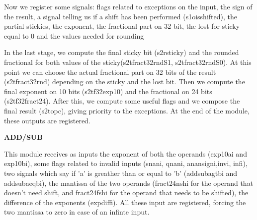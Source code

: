Now we register some signals: flags related to exceptions on the input, the sign of the result, a signal telling us if a shift has been performed (s1o\textunderscore is\textunderscore shifted), the partial stickies, the exponent, the fractional part on 32 bit, the lost for sticky equal to 0 and the values needed for rounding

In the last stage, we compute the final sticky bit (s2r\textunderscore sticky) and the rounded fractional for both values of the sticky(s2t\textunderscore fract32\textunderscore rndS1, s2t\textunderscore fract32\textunderscore rndS0). At this point we can choose the actual fractional part on 32 bits of the result (s2t\textunderscore fract32\textunderscore rnd) depending on the sticky and the lost bit.
Then we compute the final exponent on 10 bits (s2t\textunderscore f32\textunderscore exp10) and the fractional on 24 bits (s2t\textunderscore f32\textunderscore fract24).
After this, we compute some useful flags and we compose the final result (s2t\textunderscore opc), giving priority to the exceptions. At the end of the module, these outputs are registered.
\newline

\textbf{ADD/SUB}
\newline

This module receives as inputs the exponent of both the operands (exp10a\textunderscore i and exp10b\textunderscore i), some flags related to invalid inputs (snan\textunderscore i, qnan\textunderscore i, anan\textunderscore sign\textunderscore i,inv\textunderscore i, inf\textunderscore i), two signals which say if 'a' is greather than or equal to 'b' (addsub\textunderscore agtb\textunderscore i and addsub\textunderscore aeqb\textunderscore i), the mantissa of the two operands (fract24nsh\textunderscore i for the operand that doesn't need shift, and fract24fsh\textunderscore i for the operand that needs to be shifted), the difference of the exponents (exp\textunderscore diff\textunderscore i). All these input are registered, forcing the two mantissa to zero in case of an infinte input.


